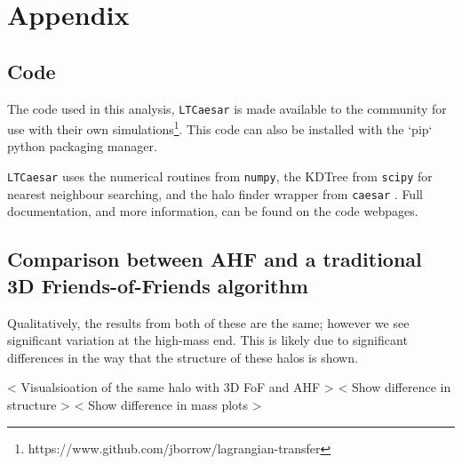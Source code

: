 \section{Appendix}

\subsection{Code}

The code used in this analysis, {\tt LTCaesar} is made available to the community for use with their own simulations\footnote{https://www.github.com/jborrow/lagrangian-transfer}. This code can also be installed with the `pip` python packaging manager.

{\tt LTCaesar} uses the numerical routines from {\tt numpy}, the KDTree from {\tt scipy} for nearest neighbour searching, and the halo finder wrapper from {\tt caesar} \citep{numpy, scipy, caesar}. Full documentation, and more information, can be found on the code webpages.

\subsection{Comparison between AHF and a traditional 3D Friends-of-Friends algorithm}

Qualitatively, the results from both of these are the same; however we see significant variation at the high-mass end. This is likely due to significant differences in the way that the structure of these halos is shown.

< Visualsioation of the same halo with 3D FoF and AHF >
< Show difference in structure >
< Show difference in mass plots >
